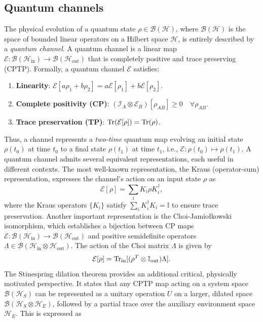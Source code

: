 \subsection{Quantum channels}
The physical evolution of a quantum state \(\rho \in \mathcal{B}(\mathcal{H})\), where \(\mathcal{B}(\mathcal{H})\) is the space of bounded linear operators on a Hilbert space \(\mathcal{H}\), is entirely described by a \emph{quantum channel}. A quantum channel is a linear map \(\mathcal{E}: \mathcal{B}(\mathcal{H}_{\mathrm{in}}) \to \mathcal{B}(\mathcal{H}_{\mathrm{out}})\) that is completely positive and trace preserving (CPTP). Formally, a quantum channel \(\mathcal{E}\) satisfies:
\begin{enumerate}
\item \textbf{Linearity}: \(\mathcal{E}[a\rho_1+b\rho_2]=a\mathcal{E}[\rho_1]+b\mathcal{E}[\rho_2]\).
\item \textbf{Complete positivity (CP)}: \((\mathcal{I}_A\otimes \mathcal{E}_B)[\rho_{AB}]\geq 0 \quad \forall \rho_{AB}\).
\item \textbf{Trace preservation (TP)}: \(\mathrm{Tr}(\mathcal{E}[\rho]) = \mathrm{Tr}(\rho)\).
\end{enumerate}
Thus, a channel represents a \emph{two-time} quantum map evolving an initial state \(\rho(t_0)\) at time \(t_0\) to a final state \(\rho(t_1)\) at time \(t_1\), i.e., \(\mathcal{E}: \rho(t_0) \mapsto \rho(t_1)\). A quantum channel admits several equivalent representations, each useful in different contexts. The most well-known representation, the Kraus (operator-sum) representation, expresses the channel's action on an input state \(\rho\) as
\begin{equation}
    \mathcal{E}[\rho] = \sum_i K_i \rho K_i^\dagger,
\end{equation}
where the Kraus operators \(\{K_i\}\) satisfy \(\sum_i K_i^\dagger K_i = \mathbb{I}\) to ensure trace preservation. Another important representation is the Choi-Jamiołkowski isomorphism, which establishes a bijection between CP maps \(\mathcal{E}: \mathcal{B}(\mathcal{H}_{\mathrm{in}}) \to \mathcal{B}(\mathcal{H}_{\mathrm{out}})\) and positive semidefinite operators \(\Lambda \in \mathcal{B}(\mathcal{H}_{\mathrm{in}} \otimes \mathcal{H}_{\mathrm{out}})\). The action of the Choi matrix \(\Lambda\) is given by
\begin{equation}\label{eq:choi-rep}
    \mathcal{E}[\rho] = \mathrm{Tr}_{\mathrm{in}}[(\rho^T \otimes \mathbb{I}_{\mathrm{out}})\Lambda].
\end{equation}
The Stinespring dilation theorem provides an additional critical, physically motivated perspective. It states that any CPTP map acting on a system space \(\mathcal{B}(\mathcal{H}_S)\) can be represented as a unitary operation \(U\) on a larger, dilated space \(\mathcal{B}(\mathcal{H}_S \otimes \mathcal{H}_E)\), followed by a partial trace over the auxiliary environment space \(\mathcal{H}_E\). This is expressed as
